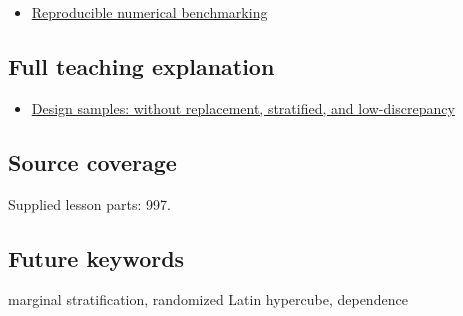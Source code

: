 \begin{itemize}
\tightlist
\item
  \hyperref[appendix-b9db93e28371]{Reproducible numerical benchmarking}
\end{itemize}

\subsection{Full teaching explanation}\label{appendix-1c5e85693a06-full-teaching-explanation}

\begin{itemize}
\tightlist
\item
  \hyperref[02-foundations-ii-ch031-design-samples-without-replacement-stratified-and-low-discrepancy]{Design samples: without replacement, stratified, and low-discrepancy}
\end{itemize}

\subsection{Source coverage}\label{appendix-1c5e85693a06-source-coverage}

Supplied lesson parts: 997.

\subsection{Future keywords}\label{appendix-1c5e85693a06-future-keywords}

marginal stratification, randomized Latin hypercube, dependence
